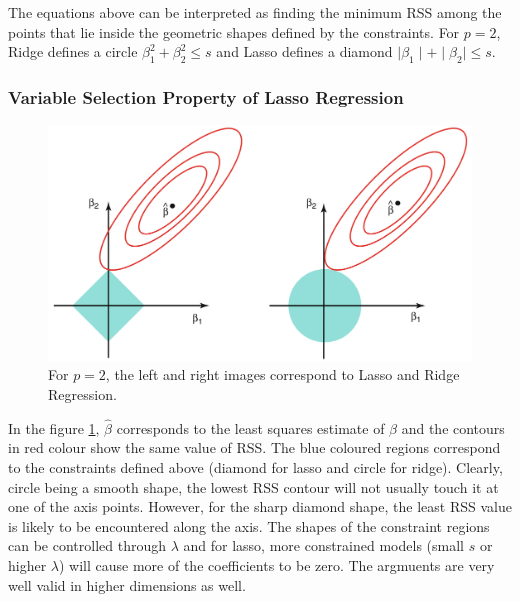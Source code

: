 \documentclass[11pt, a4paper]{article}
\begin{document}
    The equations above can be interpreted as finding the minimum RSS among the points that lie inside the geometric shapes defined by the constraints. For $p = 2$, Ridge defines a circle $\beta_{1}^{2} + \beta_{2}^{2} \leq s$ and Lasso defines a diamond $\mid \beta_{1} \mid + \mid \beta_{2} \mid \leq s$.

    
    \subsubsection{Variable Selection Property of Lasso Regression}
    \begin{figure}[h]
    \includegraphics[scale=0.4]{lasso_contours}
    \centering
    \caption{For $p=2$, the left and right images correspond to Lasso and Ridge Regression.}
    \label{fig:lasso_contour} %
    \end{figure}

    In the figure \ref{fig:lasso_contour}, $\hat{\beta}$ corresponds to the least squares estimate of $\beta$ and the contours in red colour show the same value of RSS. The blue coloured regions correspond to the constraints defined above (diamond for lasso and circle for ridge).\newline
    Clearly, circle being a smooth shape, the lowest RSS contour will not usually touch it at one of the axis points. However, for the sharp diamond shape, the least RSS value is likely to be encountered along the axis. The shapes of the constraint regions can be controlled through $\lambda$ and for lasso, more constrained models (small $s$ or higher $\lambda$) will cause more of the coefficients to be zero. The argmuents are very well valid in higher dimensions as well.

    
\end{document}
